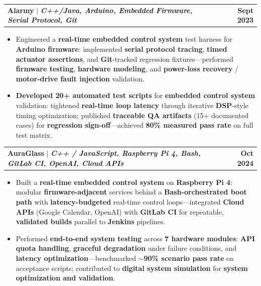 \documentclass[letterpaper,10pt]{article}
\makeatletter
\newcommand{\resumeItem}[1]{
  \item\small{
    {#1 \vspace{-1pt}}
  }
}
\newcommand{\resumeProjectHeading}[2]{
    \item
    \begin{tabular*}{1.001\textwidth}{l@{\extracolsep{\fill}}r}
      \small#1 & \textbf{\small #2}\\
    \end{tabular*}\vspace{-9pt}
}
\newcommand{\resumeItemListStart}{\begin{itemize}[leftmargin=0.15in]}
\newcommand{\resumeItemListEnd}{\end{itemize}\vspace{-4pt}}
\makeatother
\begin{document}
    \resumeProjectHeading
          {\textbf{Alarmy} $|$ \emph{\textbf{C++/Java, Arduino, Embedded Firmware, Serial Protocol, Git}}}{Sept 2023}
    \resumeItemListStart
        \resumeItem{Engineered a \textbf{real-time embedded control system} test harness for \textbf{Arduino firmware}: implemented \textbf{serial protocol tracing}, \textbf{timed actuator assertions}, and \textbf{Git}-tracked regression fixtures---performed \textbf{firmware testing}, \textbf{hardware modeling}, and \textbf{power-loss recovery} / \textbf{motor-drive fault injection} validation.}
        \vspace{-2pt}
        \resumeItem{\textbf{Developed 20+ automated test scripts} for \textbf{embedded control system} validation: tightened \textbf{real-time loop latency} through iterative \textbf{DSP}-style timing optimization; published \textbf{traceable QA artifacts} (15+ documented cases) for \textbf{regression sign-off}---achieved \textbf{80\% measured pass rate} on full test matrix.}
    \resumeItemListEnd
    \vspace{-18pt}

    \resumeProjectHeading
        {\textbf{AuraGlass} $|$ \emph{\textbf{C++ / JavaScript, Raspberry Pi 4, Bash, GitLab CI, OpenAI, Cloud APIs}}}{Oct 2024}
        \resumeItemListStart
            \resumeItem{Built a \textbf{real-time embedded control system} on \textbf{Raspberry Pi 4}: modular \textbf{firmware-adjacent} services behind a \textbf{Bash-orchestrated boot path} with \textbf{latency-budgeted} real-time control loops---integrated \textbf{Cloud APIs} (Google Calendar, OpenAI) with \textbf{GitLab CI} for repeatable, \textbf{validated builds} parallel to \textbf{Jenkins} pipelines.}
            \vspace{-2pt}
            \resumeItem{Performed \textbf{end-to-end system testing} across \textbf{7 hardware modules}: \textbf{API quota handling}, \textbf{graceful degradation} under failure conditions, and \textbf{latency optimization}---benchmarked \textbf{$\sim$90\% scenario pass rate} on acceptance scripts; contributed to \textbf{digital system simulation} for \textbf{system optimization and validation}.}
        \resumeItemListEnd
    \vspace{-18pt}
\end{document}

